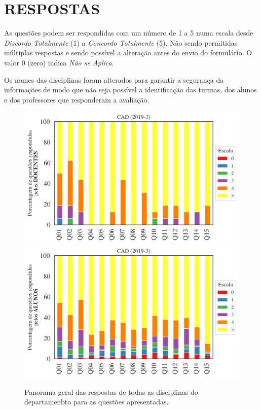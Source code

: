\documentclass[a4paper,10pt]{article}
\begin{document}
\section{RESPOSTAS}
As questões podem ser respondidas com um número de 1 a 5 numa escala desde {\it Discordo Totalmente} (1) a {\it Concordo Totalmente} (5). Não sendo permitidas múltiplas respostas e sendo possível a alteração antes do envio do formulário. O valor 0 (zero) indica {\it Não se Aplica}.

Os nomes das disciplinas foram alterados para garantir a segurança da informações de modo que não seja possível a identificação das turmas, dos alunos  e dos professores que responderam a avaliação.

\begin{figure}[h]
\centering
\includegraphics[width=0.85\linewidth]{analise_geral_departamento_CAD_docentes.png}
\includegraphics[width=0.85\linewidth]{analise_geral_departamento_CAD_alunos.png}
\caption{\label{fig:analise_geral_departamento}            Panorama geral das respostas de todas as  disciplinas do departamenbto para as questões apresentadas.}
\end{figure}
\end{document}
